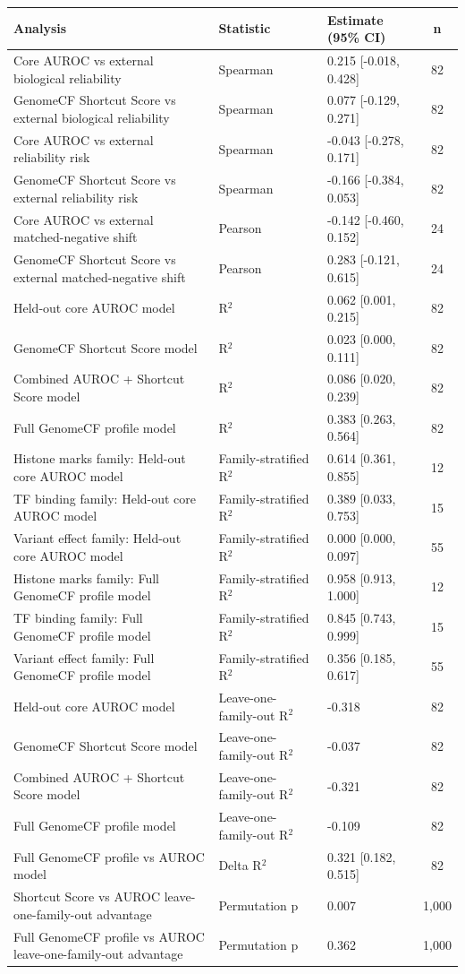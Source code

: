 \begin{tabular}{p{5.5cm}p{1.2cm}p{3.5cm}c}
\toprule
Analysis & Statistic & Estimate (95\% CI) & n \\
\midrule
Core AUROC vs external biological reliability & Spearman & 0.215 [-0.018, 0.428] & 82 \\
GenomeCF Shortcut Score vs external biological reliability & Spearman & 0.077 [-0.129, 0.271] & 82 \\
Core AUROC vs external reliability risk & Spearman & -0.043 [-0.278, 0.171] & 82 \\
GenomeCF Shortcut Score vs external reliability risk & Spearman & -0.166 [-0.384, 0.053] & 82 \\
Core AUROC vs external matched-negative shift & Pearson & -0.142 [-0.460, 0.152] & 24 \\
GenomeCF Shortcut Score vs external matched-negative shift & Pearson & 0.283 [-0.121, 0.615] & 24 \\
Held-out core AUROC model & R$^2$ & 0.062 [0.001, 0.215] & 82 \\
GenomeCF Shortcut Score model & R$^2$ & 0.023 [0.000, 0.111] & 82 \\
Combined AUROC + Shortcut Score model & R$^2$ & 0.086 [0.020, 0.239] & 82 \\
Full GenomeCF profile model & R$^2$ & 0.383 [0.263, 0.564] & 82 \\
Histone marks family: Held-out core AUROC model & Family-stratified R$^2$ & 0.614 [0.361, 0.855] & 12 \\
TF binding family: Held-out core AUROC model & Family-stratified R$^2$ & 0.389 [0.033, 0.753] & 15 \\
Variant effect family: Held-out core AUROC model & Family-stratified R$^2$ & 0.000 [0.000, 0.097] & 55 \\
Histone marks family: Full GenomeCF profile model & Family-stratified R$^2$ & 0.958 [0.913, 1.000] & 12 \\
TF binding family: Full GenomeCF profile model & Family-stratified R$^2$ & 0.845 [0.743, 0.999] & 15 \\
Variant effect family: Full GenomeCF profile model & Family-stratified R$^2$ & 0.356 [0.185, 0.617] & 55 \\
Held-out core AUROC model & Leave-one-family-out R$^2$ & -0.318 & 82 \\
GenomeCF Shortcut Score model & Leave-one-family-out R$^2$ & -0.037 & 82 \\
Combined AUROC + Shortcut Score model & Leave-one-family-out R$^2$ & -0.321 & 82 \\
Full GenomeCF profile model & Leave-one-family-out R$^2$ & -0.109 & 82 \\
Full GenomeCF profile vs AUROC model & Delta R$^2$ & 0.321 [0.182, 0.515] & 82 \\
Shortcut Score vs AUROC leave-one-family-out advantage & Permutation p & 0.007 & 1,000 \\
Full GenomeCF profile vs AUROC leave-one-family-out advantage & Permutation p & 0.362 & 1,000 \\
\bottomrule
\end{tabular}
